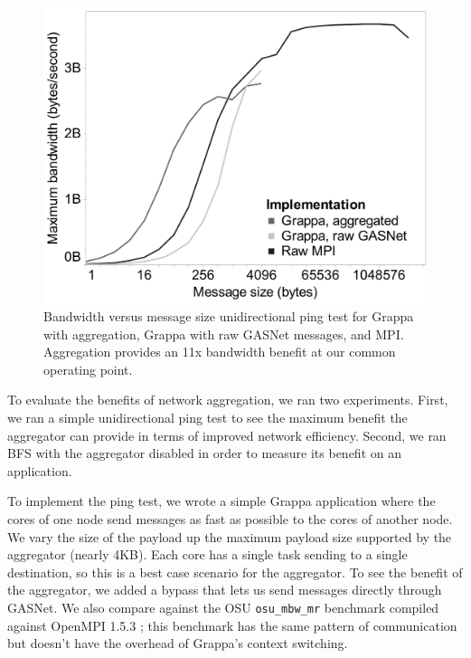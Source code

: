 \begin{figure}[htb]
\begin{center}
  \includegraphics[width=0.95\columnwidth]{figs/aggregator_ping}
\begin{minipage}{0.95\columnwidth}
  \caption{\label{fig:aggregator-ping} Bandwidth versus message size
    unidirectional ping test for Grappa with aggregation, Grappa with
    raw GASNet messages, and MPI. Aggregation provides an 11x
    bandwidth benefit at our common operating point.}
\end{minipage}
\vspace{-3ex}
\end{center}
\end{figure}

To evaluate the benefits of network aggregation, we ran two experiments.
First, we ran a simple unidirectional ping test to see the maximum
benefit the aggregator can provide in terms of improved network
efficiency. Second, we ran BFS with the aggregator disabled in order to
measure its benefit on an application.

To implement the ping test, we wrote a simple Grappa application where
the cores of one node send messages as fast as possible to the cores
of another node. We vary the size of the payload up the maximum
payload size supported by the aggregator (nearly 4KB). Each core has a
single task sending to a single destination, so this is a best case
scenario for the aggregator. To see the benefit of the aggregator, we
added a bypass that lets us send messages directly through GASNet. We
also compare against the OSU \texttt{osu\_mbw\_mr} benchmark
  compiled against OpenMPI 1.5.3 ; this
benchmark has the same pattern of communication but doesn't have the
overhead of Grappa's context switching.

